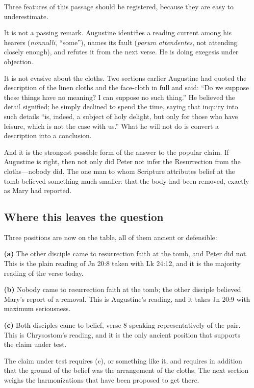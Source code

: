 Three features of this passage should be registered, because they are easy to
underestimate.

It is not a passing remark. Augustine identifies a reading current among his
hearers (\emph{nonnulli}, ``some''), names its fault (\emph{parum
attendentes}, not attending closely enough), and refutes it from the next
verse. He is doing exegesis under objection.

It is not evasive about the cloths. Two sections earlier Augustine had quoted
the description of the linen cloths and the face-cloth in full and said:
``Do we suppose these things have no meaning? I can suppose no such thing.''
He believed the detail signified; he simply declined to spend the time, saying
that inquiry into such details ``is, indeed, a subject of holy delight, but
only for those who have leisure, which is not the case with us.'' What he will
not do is convert a description into a conclusion.

And it is the strongest possible form of the answer to the popular claim. If
Augustine is right, then not only did Peter not infer the Resurrection from the
cloths---nobody did. The one man to whom Scripture attributes belief at the
tomb believed something much smaller: that the body had been removed, exactly
as Mary had reported.

\subsection{Where this leaves the question}

Three positions are now on the table, all of them ancient or defensible:

\begin{studyframe}\small
\textbf{(a)} The other disciple came to resurrection faith at the tomb, and
Peter did not. This is the plain reading of Jn 20:8 taken with Lk 24:12, and
it is the majority reading of the verse today.

\textbf{(b)} Nobody came to resurrection faith at the tomb; the other disciple
believed Mary's report of a removal. This is Augustine's reading, and it takes
Jn 20:9 with maximum seriousness.

\textbf{(c)} Both disciples came to belief, verse 8 speaking representatively
of the pair. This is Chrysostom's reading, and it is the only ancient position
that supports the claim under test.
\end{studyframe}

The claim under test requires (c), or something like it, and requires in
addition that the ground of the belief was the arrangement of the cloths. The
next section weighs the harmonizations that have been proposed to get there.
